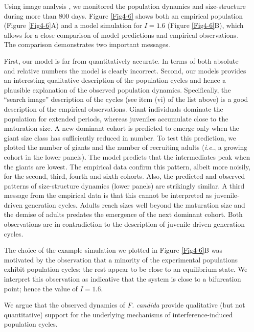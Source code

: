 Using image analysis \autocite{mallard2012a,mallard2013a}, we monitored the
population dynamics and size-structure during more than $800$ days. Figure
\ref{Fig4-6} shows both an empirical population (Figure \ref{Fig4-6}A) and a
model simulation for $I = 1.6$ (Figure \ref{Fig4-6}B), which allows for a close
comparison of model predictions and empirical observations. The comparison
demonstrates two important messages.

First, our model is far from quantitatively accurate. In terms of both absolute
and relative numbers the model is clearly incorrect. Second, our models provides
an interesting qualitative description of the population cycles and hence a
plausible explanation of the observed population dynamics. Specifically, the
“search image” description of the cycles (see item (vi) of the list above) is a
good description of the empirical observations. Giant individuals dominate the
population for extended periods, whereas juveniles accumulate close to the
maturation size. A new dominant cohort is predicted to emerge only when the
giant size class has sufficiently reduced in number. To test this prediction, we
plotted the number of giants and the number of recruiting adults (\textit{i.e.},
a growing cohort in the lower panels). The model predicts that the intermediates
peak when the giants are lowest. The empirical data confirm this pattern, albeit
more noisily, for the second, third, fourth and sixth cohorts. Also, the
predicted and observed patterns of size-structure dynamics (lower panels) are
strikingly similar. A third message from the empirical data is that this cannot
be interpreted as juvenile-driven generation cycles. Adults reach sizes well
beyond the maturation size and the demise of adults predates the emergence of
the next dominant cohort. Both observations are in contradiction to the
description of juvenile-driven generation cycles.

The choice of the example simulation we plotted in Figure \ref{Fig4-6}B was
motivated by the observation that a minority of the experimental populations exhibit
population cycles; the rest appear to be close to an equilibrium state. We
interpret this observation as indicative that the system is close to a
bifurcation point; hence the value of $I = 1.6$.

We argue that the observed dynamics of \textit{F. candida} provide qualitative
(but not quantitative) support for the underlying mechanisms of
interference-induced population cycles.

